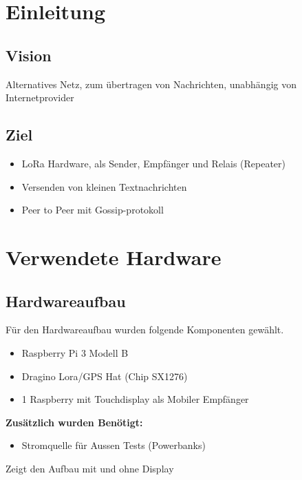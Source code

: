 \documentclass[ngerman, a4paper, 11pt]{scrartcl}
\begin{document}
	


\section{Einleitung}


\subsection{Vision}
Alternatives Netz, zum übertragen von Nachrichten, unabhängig von Internetprovider

\subsection{Ziel}
\begin{itemize}
\item LoRa Hardware, als Sender, Empfänger und Relais (Repeater)
\item Versenden von kleinen Textnachrichten
\item Peer to Peer mit Gossip-protokoll
\end{itemize}



\section{Verwendete Hardware}

\subsection{Hardwareaufbau}
Für den Hardwareaufbau wurden folgende Komponenten gewählt.

\begin{itemize}
	\item Raspberry Pi 3 Modell B 
	\item Dragino Lora/GPS Hat (Chip SX1276)
	\item 1 Raspberry mit Touchdisplay als Mobiler Empfänger
\end{itemize}


\textbf{Zusätzlich wurden Benötigt:}

\begin{itemize}
	\item Stromquelle für Aussen Tests (Powerbanks)
\end{itemize}

 Zeigt den Aufbau mit und ohne Display
\end{document}
